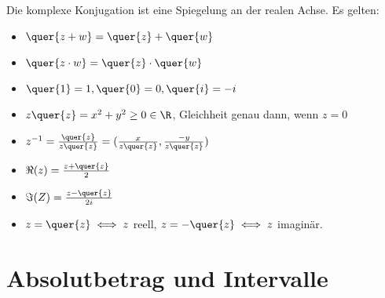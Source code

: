 Die komplexe Konjugation ist eine Spiegelung an der realen Achse. Es gelten:
\begin{itemize}
    \item $\quer{z + w} = \quer{z}+\quer{w}$
    \item $\quer{z \cdot w} = \quer{z}\cdot\quer{w}$
    \item $\quer{1} = 1, \quer{0} = 0, \quer{i} = -i$
    \item $z\quer{z} = x^2 + y^2 \geq 0 \in \R$, Gleichheit genau dann, wenn $z=0$
    \item $z^{-1}= \frac{\quer{z}}{z\quer{z}}=(\frac{x}{z\quer{z}}, \frac{-y}{z\quer{z}})$
    \item $\Re(z) = \frac{z+\quer{z}}{2}$
    \item $\Im(Z) = \frac{z-\quer{z}}{2i}$
    \item $z = \quer{z} \iff z$ reell, $z=-\quer{z} \iff z$ imaginär.
\end{itemize}

\section{Absolutbetrag und Intervalle}
